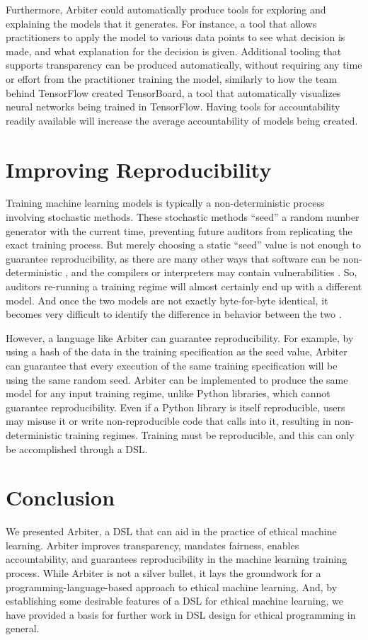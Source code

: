 \documentclass[letterpaper]{article}
\newcommand{\citep}[1]{\cite{#1}}
\begin{document}
Furthermore, Arbiter could automatically produce tools for exploring and explaining the models that it generates. For instance, a tool that allows practitioners to apply the model to various data points to see what decision is made, and what explanation for the decision is given. Additional tooling that supports transparency can be produced automatically, without requiring any time or effort from the practitioner training the model, similarly to how the team behind TensorFlow created TensorBoard, a tool that automatically visualizes neural networks being trained in TensorFlow. Having tools for accountability readily available will increase the average accountability of models being created.

\section{Improving Reproducibility}
Training machine learning models is typically a non-deterministic process involving stochastic methods. These stochastic methods ``seed'' a random number generator with the current time, preventing future auditors from replicating the exact training process. But merely choosing a static ``seed'' value is not enough to guarantee reproducibility, as there are many other ways that software can be non-deterministic \citep{Maste2017}, and the compilers or interpreters may contain vulnerabilities \citep{Thompson1984}. So, auditors re-running a training regime will almost certainly end up with a different model. And once the two models are not exactly byte-for-byte identical, it becomes very difficult to identify the difference in behavior between the two \citep{Perry2014}.

However, a language like Arbiter can guarantee reproducibility. For example, by using a hash of the data in the training specification as the seed value, Arbiter can guarantee that every execution of the same training specification will be using the same random seed. Arbiter can be implemented to produce the same model for any input training regime, unlike Python libraries, which cannot guarantee reproducibility. Even if a Python library is itself reproducible, users may misuse it or write non-reproducible code that calls into it, resulting in non-deterministic training regimes. Training must be reproducible, and this can only be accomplished through a DSL.

\section{Conclusion}
We presented Arbiter, a DSL that can aid in the practice of ethical machine learning. Arbiter improves transparency, mandates fairness, enables accountability, and guarantees reproducibility in the machine learning training process. While Arbiter is not a silver bullet, it lays the groundwork for a programming-language-based approach to ethical machine learning. And, by establishing some desirable features of a DSL for ethical machine learning, we have provided a basis for further work in DSL design for ethical programming in general. 



\end{document}
